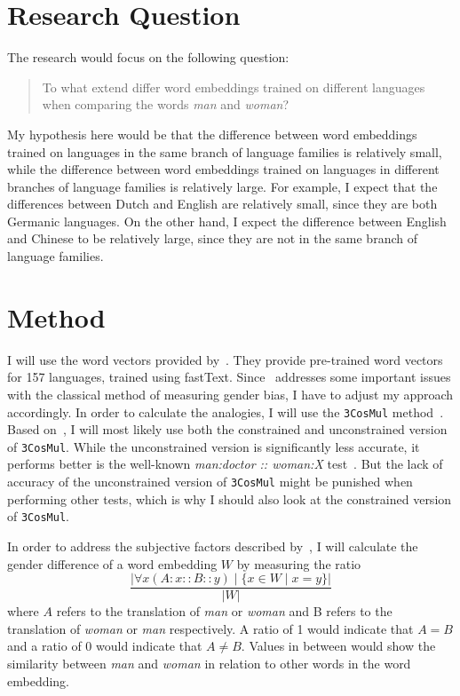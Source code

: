 \documentclass[english, a4paper, 10pt]{article}
\begin{document}
\section*{Research Question}
The research would focus on the following question:

\begin{quote}
    To what extend differ word embeddings trained on different languages when comparing
    the words \textit{man} and \textit{woman}?
\end{quote}

My hypothesis here would be that the difference between word embeddings
trained on languages in the same branch of language families is relatively small, while
the difference between word embeddings trained on languages in different branches of
language families is relatively large.
For example, I expect that the differences between Dutch and English are
relatively small, since they are both Germanic languages. On the other hand, I expect the
difference between English and Chinese to be relatively large, since they are not in the
same branch of language families.

\section*{Method}
I will use the word vectors provided by~\cite{grave2018learning}. They provide
pre-trained word vectors for 157 languages, trained using fastText.
Since~\cite{2019arXiv190509866N} addresses some important issues with the classical method
of measuring gender bias, I have to adjust my approach accordingly.
In order to calculate the analogies, I will use the \texttt{3CosMul}
method~\cite{Levy14linguisticregularities}. Based on~\cite{2019arXiv190509866N},
I will most likely use both the constrained and unconstrained version of \texttt{3CosMul}.
While the unconstrained version is significantly less accurate, it performs better is the
well-known \textit{man:doctor :: woman:X} test~\cite{2019arXiv190509866N}.
But the lack of accuracy of the unconstrained version of \texttt{3CosMul} might be
punished when performing other tests, which is why I should also look at the constrained
version of \texttt{3CosMul}.

In order to address the subjective factors described by~\cite{2019arXiv190509866N}, I
will calculate the gender difference of a word embedding $W$ by measuring the ratio
$$
\frac{ |\forall x (A : x :: B :: y) \mid \{x \in W \mid x = y\}| } { |W| }
$$
where $A$ refers to the translation of \textit{man} or \textit{woman} and B refers to the translation of \textit{woman} or \textit{man} respectively.
A ratio of 1 would indicate that $A = B$ and a ratio of 0 would indicate that $A \neq B$.
Values in between would show the similarity between \textit{man} and \textit{woman} in relation to other words in the word embedding.
\end{document}
